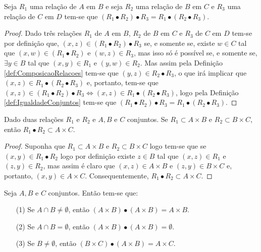 \begin{teorema}
  Seja $R_1$ uma relação de $A$ em $B$ e seja $R_2$ uma relação de $B$ em $C$ e $R_3$ uma relação de $C$ em $D$ tem-se que $(R_1 \bullet R_2) \bullet R_3 = R_1 \bullet (R_2 \bullet R_3)$.
\end{teorema}

\begin{proof}
	Dado três relações $R_1$ de $A$ em $B$, $R_2$ de $B$ em $C$ e $R_3$ de $C$ em $D$ tem-se por definição que, $(x, z) \in (R_1 \bullet R_2) \bullet R_3$ se, e somente se, existe $w \in C$ tal que $(x, w) \in (R_1 \bullet R_2)$ e $(w, z) \in R_3$, mas isso só é possível se, e somente se, $\exists y \in B$ tal que $(x, y) \in R_1$ e $(y, w) \in R_2$. Mas assim pela Definição \ref{def:ComposicaoRelacoes} tem-se que $(y, z) \in R_2 \bullet R_3$, o que irá implicar que $(x, z) \in R_1 \bullet (R_2 \bullet R_3)$ e, portanto, tem-se que $(x, z) \in (R_1 \bullet R_2) \bullet R_3 \Longleftrightarrow (x, z) \in R_1 \bullet (R_2 \bullet R_3)$, logo pela Definição \ref{def:IgualdadeConjuntos} tem-se que $(R_1 \bullet R_2) \bullet R_3 = R_1 \bullet (R_2 \bullet R_3)$.
\end{proof}

\begin{teorema}
	Dado duas relações $R_1$ e $R_2$ e $A, B$ e $C$ conjuntos. Se $R_1 \subset A \times B$ e $R_2 \subset B \times C$, então $R_1 \bullet R_2 \subset A \times C$.
\end{teorema}

\begin{proof}
	 Suponha que $R_1 \subset A \times B$ e $R_2 \subset B \times C$ logo tem-se que se $(x, y) \in R_1 \bullet R_2$ logo por definição existe $z \in B$ tal que $(x, z) \in R_1$ e $(z, y) \in R_2$, mas assim é claro que $(x, z) \in A \times B$ e $(z, y) \in B \times C$ e, portanto, $(x, y) \in A \times C$. Consequentemente, $R_1 \bullet R_2 \subset A \times C$.
\end{proof}

\begin{teorema}
	Seja $A, B$ e $C$ conjuntos. Então tem-se que:
	\begin{itemize}
		\item[(1)] Se $A \cap B \neq \emptyset$, então $(A \times B) \bullet (A \times B) = A \times B$.
		\item[(2)] Se $A \cap B = \emptyset$, então $(A \times B) \bullet (A \times B) = \emptyset$.
		\item[(3)] Se $B \neq \emptyset$, então $(B \times C) \bullet (A \times B) = A \times C$.
	\end{itemize}
\end{teorema}

